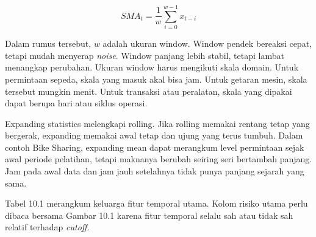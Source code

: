 \[
SMA_t = \dfrac{1}{w}\sum_{i=0}^{w-1} x_{t-i}
\]

Dalam rumus tersebut, \(w\) adalah ukuran window. Window pendek bereaksi cepat, tetapi mudah menyerap \emph{noise}. Window panjang lebih stabil, tetapi lambat menangkap perubahan. Ukuran window harus mengikuti skala domain. Untuk permintaan sepeda, skala yang masuk akal bisa jam. Untuk getaran mesin, skala tersebut mungkin menit. Untuk transaksi atau peralatan, skala yang dipakai dapat berupa hari atau siklus operasi.

Expanding statistics melengkapi rolling. Jika rolling memakai rentang tetap yang bergerak, expanding memakai awal tetap dan ujung yang terus tumbuh. Dalam contoh Bike Sharing, expanding mean dapat merangkum level permintaan sejak awal periode pelatihan, tetapi maknanya berubah seiring seri bertambah panjang. Jam pada awal data dan jam jauh setelahnya tidak punya panjang sejarah yang sama.

Tabel 10.1 merangkum keluarga fitur temporal utama. Kolom risiko utama perlu dibaca bersama Gambar 10.1 karena fitur temporal selalu sah atau tidak sah relatif terhadap \emph{cutoff}.


